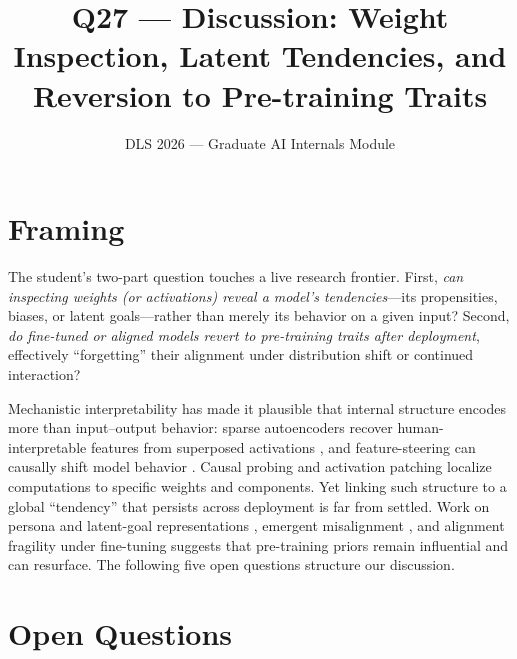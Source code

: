 \documentclass[11pt]{article}
\title{Q27 --- Discussion: Weight Inspection, Latent Tendencies, and Reversion to Pre-training Traits}
\author{DLS 2026 --- Graduate AI Internals Module}
\date{}
\begin{document}
\maketitle

\section*{Framing}

The student's two-part question touches a live research frontier. First, \emph{can inspecting weights (or activations) reveal a model's tendencies}---its propensities, biases, or latent goals---rather than merely its behavior on a given input? Second, \emph{do fine-tuned or aligned models revert to pre-training traits after deployment}, effectively ``forgetting'' their alignment under distribution shift or continued interaction?

Mechanistic interpretability has made it plausible that internal structure encodes more than input--output behavior: sparse autoencoders recover human-interpretable features from superposed activations \citep{bricken2023monosemanticity,cunningham2023sparse}, and feature-steering can causally shift model behavior \citep{templeton2024scaling}. Causal probing and activation patching \citep{meng2022locating,wang2023interpretability} localize computations to specific weights and components. Yet linking such structure to a global ``tendency'' that persists across deployment is far from settled. Work on persona and latent-goal representations \citep{zou2023representation}, emergent misalignment \citep{betley2025emergent}, and alignment fragility under fine-tuning \citep{qi2024finetuning} suggests that pre-training priors remain influential and can resurface. The following five open questions structure our discussion.

\section*{Open Questions}
\end{document}
